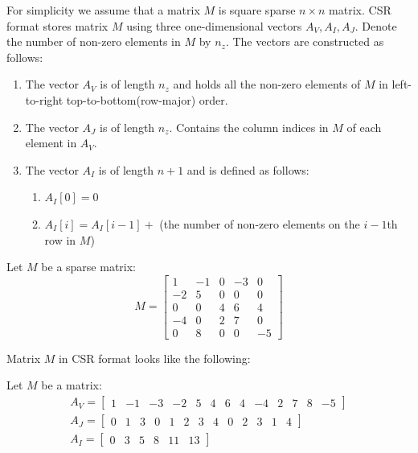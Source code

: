 \documentclass[en]{minipw} %
\begin{document}
For simplicity we assume that a matrix $M$ is square sparse $n \times n$ matrix. CSR format stores matrix $M$ using three one-dimensional vectors $A_{V}, A_{I}, A_{J}$. Denote the number of non-zero elements in $M$ by $n_{z}$. The vectors are constructed as follows:
\begin{enumerate}
\item The vector $A_{V}$ is of length $n_{z}$ and holds all the non-zero elements of $M$ in left-to-right top-to-bottom(row-major) order.
\item The vector $A_{J}$ is of length $n_{z}$. Contains the column indices in $M$ of each element in $A_{V}$.
\item The vector $A_{I}$ is of length $n+1$ and is defined as follows:
\begin{enumerate}
\item $A_{I}[0] = 0$ 
\item $A_{I}[i] = A_{I}[i-1] +$ (the number of non-zero elements on the $i-1$th row in $M$)\end{enumerate}
\end{enumerate}

\begin{example}
Let $M$ be a sparse matrix:
\begin{equation}
M =
\begin{bmatrix}
1 & -1 & 0 & -3 & 0 \\
-2 & 5 & 0 & 0 & 0 \\
0 & 0 & 4 & 6 & 4 \\
-4 & 0 & 2 & 7 & 0 \\
0 & 8 & 0 & 0 & -5
\end{bmatrix}
\end{equation}

Matrix $M$ in CSR format looks like the following:

Let $M$ be a matrix:
\begin{equation}
\begin{aligned}
A_{V} =
\begin{bmatrix}
1 & -1 & -3 & -2 & 5 & 4 & 6 & 4 & -4 & 2 & 7 & 8 & -5
\end{bmatrix}
\\
A_{J} =
\begin{bmatrix}
0 & 1 & 3 & 0 & 1 & 2 & 3 & 4 & 0 & 2 & 3 & 1 & 4
\end{bmatrix}
\\
A_{I} =
\begin{bmatrix}
0 & 3 & 5 & 8 & 11 & 13
\end{bmatrix}
\end{aligned}
\end{equation}

\end{example}
\end{document}
